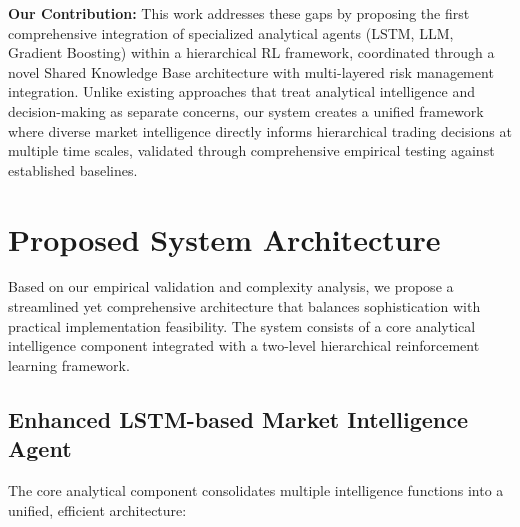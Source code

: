 \documentclass[11pt,a4paper]{article}
\begin{document}
\textbf{Our Contribution:} This work addresses these gaps by proposing the first comprehensive integration of specialized analytical agents (LSTM, LLM, Gradient Boosting) within a hierarchical RL framework, coordinated through a novel Shared Knowledge Base architecture with multi-layered risk management integration. Unlike existing approaches that treat analytical intelligence and decision-making as separate concerns, our system creates a unified framework where diverse market intelligence directly informs hierarchical trading decisions at multiple time scales, validated through comprehensive empirical testing against established baselines.

\section{Proposed System Architecture}

Based on our empirical validation and complexity analysis, we propose a streamlined yet comprehensive architecture that balances sophistication with practical implementation feasibility. The system consists of a core analytical intelligence component integrated with a two-level hierarchical reinforcement learning framework.

\subsection{Enhanced LSTM-based Market Intelligence Agent}

The core analytical component consolidates multiple intelligence functions into a unified, efficient architecture:
\end{document}
